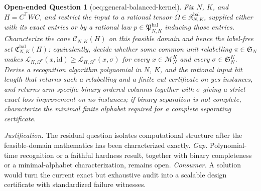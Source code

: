 \documentclass{article}
\newtheorem{openendedquestion}{Open-ended Question}
\begin{document}
\begin{openendedquestion}[oeq:general-balanced-kernel]\label{oeq:general-balanced-kernel}
Fix \(N\), \(K\), and \(H=C^{\mathsf T}WC\), and restrict the input to a rational tensor \(\Omega\in\mathfrak K^{\mathrm{bal}}_{N,K}\), supplied either with its exact entries or by a rational law \(p\in\mathfrak P^{\mathrm{bal}}_{N,K}\) inducing those entries. Characterize the cone \(\mathcal C_{N,K}(H)\) on this feasible domain and hence the label-free set \(\mathfrak C^{\mathrm{bal}}_{N,K}(H)\): equivalently, decide whether some common unit relabelling \(\pi\in\mathfrak S_N\) makes \(\mathscr L_{H,\Omega^{\pi}}(x,\mathrm{id})\geq\mathscr L_{H,\Omega^{\pi}}(x,\sigma)\) for every \(x\in\mathcal M_N^K\) and every \(\sigma\in\mathfrak S_N^K\). Derive a recognition algorithm polynomial in \(N\), \(K\), and the rational input bit length that returns such a relabelling and a finite cut certificate on yes instances, and returns arm-specific binary ordered columns together with \(\sigma\) giving a strict exact loss improvement on no instances; if binary separation is not complete, characterize the minimal finite alphabet required for a complete separating certificate.
\end{openendedquestion}
\par\smallskip\noindent \textit{Justification.} The residual question isolates computational structure after the feasible-domain mathematics has been characterized exactly. \textit{Gap.} Polynomial-time recognition or a faithful hardness result, together with binary completeness or a minimal-alphabet characterization, remains open. \textit{Consumer.} A solution would turn the current exact but exhaustive audit into a scalable design certificate with standardized failure witnesses.
\end{document}
